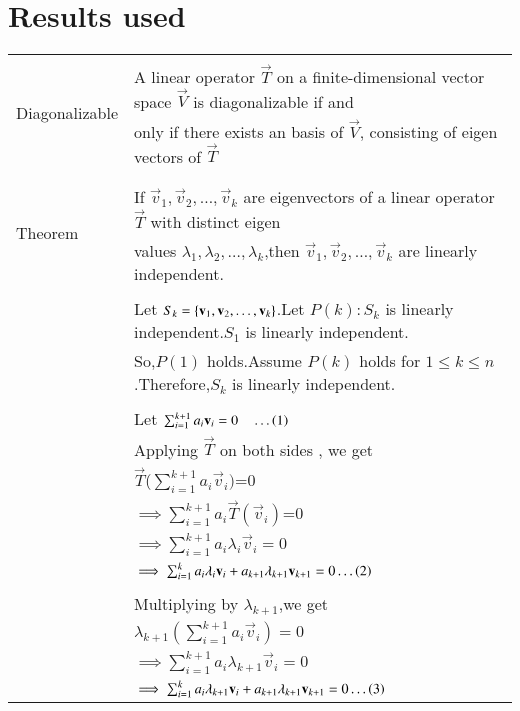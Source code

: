 \documentclass[journal,12pt]{IEEEtran}
\begin{document}
\section{\textbf{Results used}}
\begin{longtable}{|l|l|}
	\hline
	\multirow{3}{*}{Diagonalizable} 
	& \\
	& A linear operator $\vec{T}$ on a finite-dimensional vector space $\vec{V}$ is diagonalizable if and\\
    &only if there exists an basis of $\vec{V}$, consisting of eigen vectors of $\vec{T}$ \\ 
	&\\
	\hline
	\multirow{3}{*}{Theorem}
	& \\
	& If $\vec{v}_1,\vec{v}_2,\dots,\vec{v}_k$ are eigenvectors of a linear operator $\vec{T}$ with distinct eigen\\
	& values $\lambda_1,\lambda_2,\dots,\lambda_k$,then $\vec{v}_1,\vec{v}_2,\dots,\vec{v}_k$ are linearly independent.
	\\
	&\\
	&Let $S_k=\left\{\mathbf{v}_1,\mathbf{v}_2,\dots,\mathbf{v}_k\right\}$.Let $P(k): S_k$ is linearly independent.$S_1$ is linearly independent.\\
	&So,$P(1)$ holds.Assume $P(k)$ holds for $1 \le k \le n$.Therefore,$S_k$ is linearly independent.\\
	&\\
	& Let $\sum_{i=1}^{k+1} a_i\mathbf{v}_i = 0 \quad \dots \left(1\right)$\\	
	& Applying $\vec{T}$ on both sides , we get\\
	& \quad \quad\quad $\vec{T}$($\sum_{i=1}^{k+1} a_i\vec{v}_i)$=0
	\\
	& \quad  $\implies \sum_{i=1}^{k+1}a_i\vec{T}(\vec{v}_i)$=0\\
	& \quad $\implies \sum_{i=1}^{k+1}a_i\lambda_i\vec{v}_i=0$ \\
	& \quad$\implies\sum_{i=1}^{k}a_i\lambda_i\mathbf{v}_i+a_{k+1}\lambda_{k+1}\mathbf{v}_{k+1}=0\dots\left(2\right)$\\
	&\\
	& Multiplying \brak{1} by $\lambda_{k+1}$,we get\\
	& \quad \quad\quad$\lambda_{k+1}(\sum_{i=1}^{k+1} a_i\vec{v}_i)=0$ \\ 
	& \quad $\implies \sum_{i=1}^{k+1}a_i\lambda_{k+1}\vec{v}_i=0$ \\
	& \quad$\implies\sum_{i=1}^{k}a_i\lambda_{k+1}\mathbf{v}_i+a_{k+1}\lambda_{k+1}\mathbf{v}_{k+1}=0\dots\left(3\right)$\\

\end{longtable}
\end{document}

